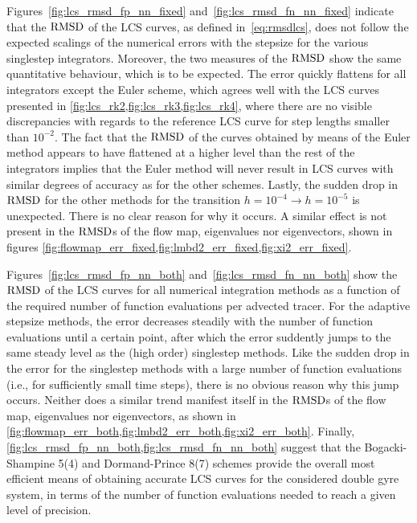 Figures~\ref{fig:lcs_rmsd_fp_nn_fixed} and~\ref{fig:lcs_rmsd_fn_nn_fixed} indicate
that the $\operatorname{RMSD}$ of the LCS curves, as defined in~\cref{eq:rmsdlcs},
does not follow the expected scalings of the numerical errors with the
stepsize for the various singlestep integrators. Moreover, the two measures of
the $\operatorname{RMSD}$ show the same quantitative behaviour, which is to be expected. The
error quickly flattens for all integrators except the Euler scheme, which agrees
well with the LCS curves presented in
\cref{fig:lcs_rk2,fig:lcs_rk3,fig:lcs_rk4}, where there are no visible
discrepancies with regards to the reference LCS curve for step lengths smaller
than $10^{-2}$. The fact that the $\operatorname{RMSD}$ of the curves obtained
by means of the Euler method appears to have flattened at a higher level than
the rest of the integrators implies that the Euler method will never result in
LCS curves with similar degrees of accuracy as for the other schemes. Lastly,
the sudden drop in $\operatorname{RMSD}$ for the other methods for the transition
$h=10^{-4}\rightarrow{h=10^{-5}}$ is unexpected. There is no clear reason for
why it occurs. A similar effect is not present in the $\operatorname{RMSD}$s of the
flow map, eigenvalues nor eigenvectors, shown in figures
\cref{fig:flowmap_err_fixed,fig:lmbd2_err_fixed,fig:xi2_err_fixed}.



Figures~\ref{fig:lcs_rmsd_fp_nn_both} and~\ref{fig:lcs_rmsd_fn_nn_both}
show the $\operatorname{RMSD}$ of the LCS curves for all numerical integration methods as a
function of the required number of function evaluations per advected tracer.
For the adaptive stepsize methods, the error decreases steadily
with the number of function evaluations until a certain point, after which
the error suddently jumps to the same steady level as the (high order)
singlestep methods. Like the sudden drop in the error for the singlestep
methods with a large number of function evaluations (i.e., for sufficiently
small time steps), there is no obvious reason why this jump occurs. Neither
does a similar trend manifest itself in the $\operatorname{RMSD}$s of the flow map,
eigenvalues nor eigenvectors, as shown in
\cref{fig:flowmap_err_both,fig:lmbd2_err_both,fig:xi2_err_both}. Finally,
\cref{fig:lcs_rmsd_fp_nn_both,fig:lcs_rmsd_fn_nn_both} suggest that the
Bogacki-Shampine 5(4) and Dormand-Prince 8(7) schemes provide the overall most
efficient means of obtaining accurate LCS curves for the considered double gyre
system, in terms of the number of function evaluations needed to reach a given
level of precision.

